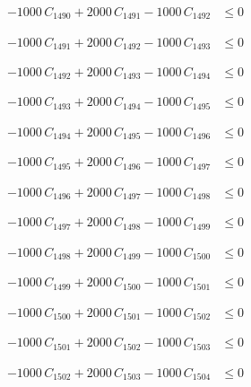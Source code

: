 \documentclass[a4paper,11pt]{article}
\begin{document}
\begin{align}
-1000\,C_{1490} + 2000\,C_{1491} - 1000\,C_{1492} &\leq 0 \nonumber
\end{align}

\begin{align}
-1000\,C_{1491} + 2000\,C_{1492} - 1000\,C_{1493} &\leq 0 \nonumber
\end{align}

\begin{align}
-1000\,C_{1492} + 2000\,C_{1493} - 1000\,C_{1494} &\leq 0 \nonumber
\end{align}

\begin{align}
-1000\,C_{1493} + 2000\,C_{1494} - 1000\,C_{1495} &\leq 0 \nonumber
\end{align}

\begin{align}
-1000\,C_{1494} + 2000\,C_{1495} - 1000\,C_{1496} &\leq 0 \nonumber
\end{align}

\begin{align}
-1000\,C_{1495} + 2000\,C_{1496} - 1000\,C_{1497} &\leq 0 \nonumber
\end{align}

\begin{align}
-1000\,C_{1496} + 2000\,C_{1497} - 1000\,C_{1498} &\leq 0 \nonumber
\end{align}

\begin{align}
-1000\,C_{1497} + 2000\,C_{1498} - 1000\,C_{1499} &\leq 0 \nonumber
\end{align}

\begin{align}
-1000\,C_{1498} + 2000\,C_{1499} - 1000\,C_{1500} &\leq 0 \nonumber
\end{align}

\begin{align}
-1000\,C_{1499} + 2000\,C_{1500} - 1000\,C_{1501} &\leq 0 \nonumber
\end{align}

\begin{align}
-1000\,C_{1500} + 2000\,C_{1501} - 1000\,C_{1502} &\leq 0 \nonumber
\end{align}

\begin{align}
-1000\,C_{1501} + 2000\,C_{1502} - 1000\,C_{1503} &\leq 0 \nonumber
\end{align}

\begin{align}
-1000\,C_{1502} + 2000\,C_{1503} - 1000\,C_{1504} &\leq 0 \nonumber
\end{align}
\end{document}
